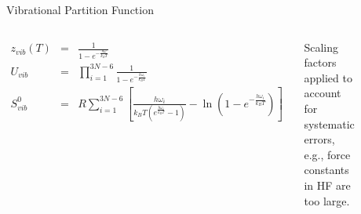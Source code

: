 \documentclass[aspectratio=169]{beamer}
\begin{document}
    \begin{frame}{Vibrational Partition Function}
        \begin{columns}

            \begin{eqnarray*}
                z_{vib}(T) & = & \frac{1}{1-e^{-\frac{h\omega}{k_BT}}}\\
                U_{vib} & = & \prod_{i=1}^{3N-6} \frac{1}{1-e^{-\frac{h\omega_i}{k_BT}}}\\
                S_{vib}^0 & = & R \sum_{i=1}^{3N-6} \left [ \frac{h\omega_i}{k_BT(e^{\frac{h\omega_i}{k_BT}}-1)} - \ln (1-e^{-\frac{h\omega_i}{k_BT}}) \right ]
            \end{eqnarray*}

            Scaling factors applied to account for systematic errors, e.g., force constants in HF are too large.


            \begin{figure}
                \centering
                \includegraphics[width=\linewidth]{lectures/figures/4_scaling_factors.png}
            \end{figure}
        \end{columns}

    \end{frame}
\end{document}
